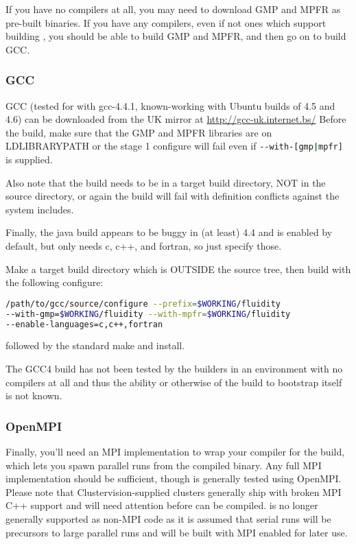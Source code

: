 If you have no compilers at all, you may need to download GMP and MPFR as
pre-built binaries. If you have any compilers, even if not ones which support
building \fluidity, you should be able to build GMP and MPFR, and then go on to
build GCC.

\subsubsection{GCC}
\label{sec:required_libraries_compilers_gcc}

GCC (tested for \fluidity with gcc-4.4.1, known-working with Ubuntu builds of
4.5 and 4.6) can be downloaded from the UK mirror at
\url{http://gcc-uk.internet.bs/} Before the build, make sure that the GMP and
MPFR libraries are on LD{\textunderscore}LIBRARY{\textunderscore}PATH or the
stage 1 configure will fail even if
\lstinline[language=bash]+--with-[gmp|mpfr]+ is supplied.

Also note that the build needs to be in a target build directory, NOT in the
source directory, or again the build will fail with definition conflicts
against the system includes.

Finally, the java build appears to be buggy in (at least) 4.4 and is enabled by
default, but \fluidity only needs c, c++, and fortran, so just specify those.

Make a target build directory which is OUTSIDE the source tree, then build
with the following configure:

\begin{lstlisting}[language=bash]
/path/to/gcc/source/configure --prefix=$WORKING/fluidity 
--with-gmp=$WORKING/fluidity --with-mpfr=$WORKING/fluidity 
--enable-languages=c,c++,fortran
\end{lstlisting}

followed by the standard make and install.

The GCC4 build has not been tested by the \fluidity builders in an environment
with no compilers at all and thus the ability or otherwise of the build to
bootstrap itself is not known.

\subsubsection{OpenMPI}
\label{sec:required_libraries_compilers_openmpi}

Finally, you'll need an MPI implementation to wrap your compiler for the
\fluidity build, which lets you spawn parallel runs from the compiled \fluidity
binary. Any full MPI implementation should be sufficient, though \fluidity is
generally tested using OpenMPI. Please note that Clustervision-supplied
clusters generally ship with broken MPI C++ support and will need attention
before \fluidity can be compiled. \fluidity is no longer generally supported as
non-MPI code as it is assumed that serial runs will be precursors to large
parallel runs and will be built with MPI enabled for later use.

